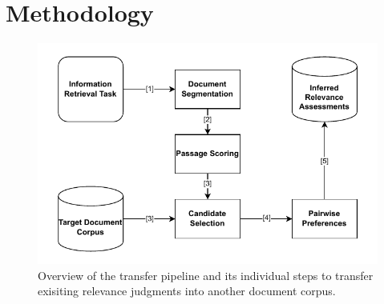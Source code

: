 \chapter{Methodology}\label{methodology}

\begin{figure}[t]
    \centering
    \includegraphics[width=\textwidth]{./graphics/drawio/transfer_pipeline.pdf}
    \caption{Overview of the transfer pipeline and its individual steps to transfer exisiting relevance judgments into another document corpus.}
    \label{fig:transfer-pipeline}
\end{figure}

